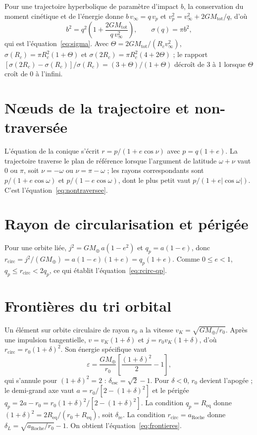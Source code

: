 \documentclass[11pt,a4paper,openany]{report}
\newcommand{\Mt}{M_{\oplus}}
\newcommand{\Req}{R_{\mathrm{eq}}}
\newcommand{\aR}{a_{\mathrm{Roche}}}
\newcommand{\Mtot}{M_{\mathrm{tot}}}
\begin{document}
Pour une trajectoire hyperbolique de paramètre d'impact $b$, la conservation du moment
cinétique et de l'énergie donne $b\,v_\infty=q\,v_p$ et $v_p^2=v_\infty^2+2G\Mtot/q$, d'où
\begin{equation}
b^2=q^2\left(1+\frac{2G\Mtot}{q\,v_\infty^2}\right),\qquad \sigma(q)=\pi b^2,
\end{equation}
qui est l'équation~\eqref{eq:sigma}. Avec $\Theta=2G\Mtot/(R_cv_\infty^2)$,
$\sigma(R_c)=\pi R_c^2(1+\Theta)$ et $\sigma(2R_c)=\pi R_c^2(4+2\Theta)$ ; le rapport
$[\sigma(2R_c)-\sigma(R_c)]/\sigma(R_c)=(3+\Theta)/(1+\Theta)$ décroît de 3 à 1 lorsque $\Theta$ croît
de 0 à l'infini.

\section{Nœuds de la trajectoire et non-traversée}

L'équation de la conique s'écrit $r=p/(1+e\cos\nu)$ avec $p=q(1+e)$. La trajectoire traverse le
plan de référence lorsque l'argument de latitude $\omega+\nu$ vaut $0$ ou $\pi$, soit $\nu=-\omega$ ou
$\nu=\pi-\omega$ ; les rayons correspondants sont $p/(1+e\cos\omega)$ et $p/(1-e\cos\omega)$, dont le
plus petit vaut $p/(1+e|\cos\omega|)$. C'est l'équation~\eqref{eq:nontraversee}.

\section{Rayon de circularisation et périgée}
\label{app:rcirc}

Pour une orbite liée, $j^2=G\Mt\,a(1-e^2)$ et $q_p=a(1-e)$, donc
$r_{\mathrm{circ}}=j^2/(G\Mt)=a(1-e)(1+e)=q_p(1+e)$. Comme $0\le e<1$,
$q_p\le r_{\mathrm{circ}}<2q_p$, ce qui établit l'équation~\eqref{eq:rcirc-qp}.

\section{Frontières du tri orbital}
\label{app:tri}

Un élément sur orbite circulaire de rayon $r_0$ a la vitesse $v_K=\sqrt{G\Mt/r_0}$. Après une
impulsion tangentielle, $v=v_K(1+\delta)$ et $j=r_0v_K(1+\delta)$, d'où
$r_{\mathrm{circ}}=r_0(1+\delta)^2$. Son énergie spécifique vaut
\begin{equation}
\varepsilon=\frac{G\Mt}{r_0}\left[\frac{(1+\delta)^2}{2}-1\right],
\end{equation}
qui s'annule pour $(1+\delta)^2=2$ : $\delta_{\mathrm{esc}}=\sqrt2-1$. Pour $\delta<0$, $r_0$ devient
l'apogée ; le demi-grand axe vaut $a=r_0/[2-(1+\delta)^2]$ et le périgée
$q_p=2a-r_0=r_0(1+\delta)^2/[2-(1+\delta)^2]$. La condition $q_p=\Req$ donne
$(1+\delta)^2=2\Req/(r_0+\Req)$, soit $\delta_{\mathrm{re}}$. La condition $r_{\mathrm{circ}}=\aR$
donne $\delta_L=\sqrt{\aR/r_0}-1$. On obtient l'équation~\eqref{eq:frontieres}.
\end{document}
